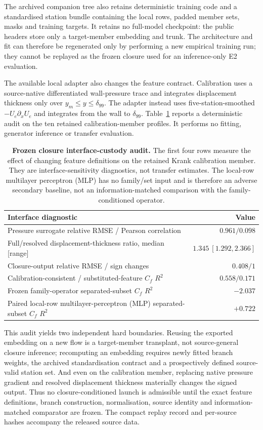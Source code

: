 \documentclass[11pt]{article}
\begin{document}
The archived companion tree also retains deterministic training code and a standardised station
bundle containing the local rows, padded member sets, masks and training targets. It retains no
full-model checkpoint: the public headers store only a target-member embedding and trunk. The
architecture and fit can therefore be regenerated only by performing a new empirical training
run; they cannot be replayed as the frozen closure used for an inference-only E2 evaluation.

The available local adapter also changes the feature contract. Calibration uses a
source-native differentiated wall-pressure trace and integrates displacement thickness only over
$y_m\leq y\leq\delta_{99}$. The adapter instead uses five-station-smoothed
$-U_e\partial_xU_e$ and integrates from the wall to $\delta_{99}$. Table~\ref{tab:s-interface}
reports a deterministic audit on the ten retained calibration-member profiles. It performs no
fitting, generator inference or transfer evaluation.

\begin{table}[h]
\centering
\small
\begin{tabular}{@{}lr@{}}
\toprule
Interface diagnostic & Value \\
\midrule
Pressure surrogate relative RMSE / Pearson correlation & $0.961 / 0.098$ \\
Full/resolved displacement-thickness ratio, median [range] &
$1.345\ [1.292,2.366]$ \\
Closure-output relative RMSE / sign changes & $0.408 / 1$ \\
Calibration-consistent / substituted-feature $C_f$ $R^2$ & $0.558 / 0.171$ \\
Frozen family-operator separated-subset $C_f$ $R^2$ & $-2.037$ \\
Paired local-row multilayer-perceptron (MLP) separated-subset $C_f$ $R^2$ & $+0.722$ \\
\bottomrule
\end{tabular}
\caption{\textbf{Frozen closure interface-custody audit.} The first four rows measure the effect
of changing feature definitions on the retained Krank calibration member. They are
interface-sensitivity diagnostics, not transfer estimates. The local-row multilayer perceptron
(MLP) has no family/set input and is therefore an adverse secondary baseline, not an
information-matched comparison with the family-conditioned operator.}\label{tab:s-interface}
\end{table}

This audit yields two independent hard boundaries. Reusing the exported embedding on a new flow
is a target-member transplant, not source-general closure inference; recomputing an embedding
requires newly fitted branch weights, the archived standardisation contract and a prospectively
defined source-valid station set. And even on the calibration member, replacing native pressure
gradient and resolved displacement thickness materially changes the signed output. Thus no
closure-conditioned launch is admissible until the exact feature definitions, branch
construction, normalisation, source identity and information-matched comparator are frozen. The
compact replay record and per-source hashes accompany the released source data.
\end{document}
